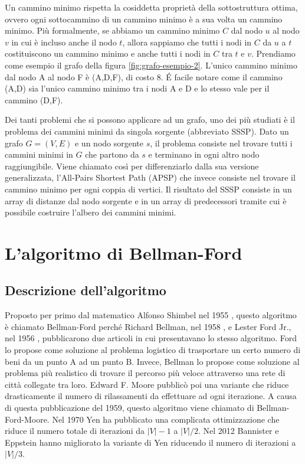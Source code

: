 \documentclass[12pt,a4paper,oneside]{book}
\begin{document}
	Un cammino minimo rispetta la cosiddetta proprietà della sottostruttura ottima, ovvero ogni sottocammino di un cammino minimo è a sua volta un cammino minimo. Più formalmente, se abbiamo un cammino minimo $C$ dal nodo $u$ al nodo $v$ in cui è incluso anche il nodo $t$, allora sappiamo che tutti i nodi in $C$ da $u$ a $t$ costituiscono un cammino minimo e anche tutti i nodi in $C$ tra $t$ e $v$. Prendiamo come esempio il grafo della figura \ref{fig:grafo-esempio-2}. L'unico cammino minimo dal nodo A al nodo F è (A,D,F), di costo 8. \'E facile notare come il cammino (A,D) sia l'unico cammino minimo tra i nodi A e D e lo stesso vale per il cammino (D,F).
	
	Dei tanti problemi che si possono applicare ad un grafo, uno dei più studiati è il problema dei cammini minimi da singola sorgente (abbreviato SSSP). Dato un grafo $G=(V,E)$ e un nodo sorgente $s$, il problema consiste nel trovare tutti i cammini minimi in $G$ che partono da $s$ e terminano in ogni altro nodo raggiungibile. Viene chiamato così per differenziarlo dalla sua versione generalizzata, l'All-Pairs Shortest Path (APSP) che invece consiste nel trovare il cammino minimo per ogni coppia di vertici. Il risultato del SSSP consiste in un array di distanze dal nodo sorgente e in un array di predecessori tramite cui è possibile costruire l'albero dei cammini minimi.
	
	\chapter{L'algoritmo di Bellman-Ford}
	\label{chap:analisi}
	\section{Descrizione dell'algoritmo}
	Proposto per primo dal matematico Alfonso Shimbel nel 1955 \cite{Shimbel1955}, questo algoritmo è chiamato Bellman-Ford perché Richard Bellman, nel 1958 \cite{Bellman1958}, e Lester Ford Jr., nel 1956 \cite{Ford1956}, pubblicarono due articoli in cui presentavano lo stesso algoritmo. Ford lo propose come soluzione al problema logistico di trasportare un certo numero di beni da un punto A ad un punto B. Invece, Bellman lo propose come soluzione al problema più realistico di trovare il percorso più veloce attraverso una rete di città collegate tra loro. Edward F. Moore pubblicò poi una variante \cite{Moore1959} che riduce drasticamente il numero di rilassamenti da effettuare ad ogni iterazione. A causa di questa pubblicazione del 1959, questo algoritmo viene chiamato di Bellman-Ford-Moore. Nel 1970 Yen \cite{Yen1970} ha pubblicato una complicata ottimizzazione che riduce il numero totale di iterazioni da $|V|-1$ a $|V|/2$. Nel 2012 Bannister e Eppstein \cite{Bannister2012} hanno migliorato la variante di Yen riducendo il numero di iterazioni a $|V|/3$.
	
\end{document}
